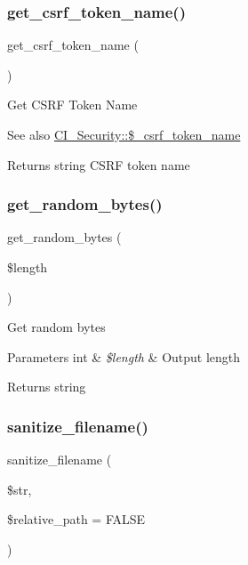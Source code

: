 \subsubsection{\texorpdfstring{get\+\_\+csrf\+\_\+token\+\_\+name()}{get\_csrf\_token\_name()}}
{\footnotesize\ttfamily get\+\_\+csrf\+\_\+token\+\_\+name (\begin{DoxyParamCaption}{ }\end{DoxyParamCaption})}

Get C\+S\+RF Token Name

\begin{DoxySeeAlso}{See also}
\mbox{\hyperlink{class_c_i___security_a6752ebca4be235c079785a87a693d932}{C\+I\+\_\+\+Security\+::\$\+\_\+csrf\+\_\+token\+\_\+name}} 
\end{DoxySeeAlso}
\begin{DoxyReturn}{Returns}
string C\+S\+RF token name 
\end{DoxyReturn}
\mbox{\label{class_c_i___security_a7d1d64e6798b98cb46fcdb304a4e1de2}} 
\subsubsection{\texorpdfstring{get\+\_\+random\+\_\+bytes()}{get\_random\_bytes()}}
{\footnotesize\ttfamily get\+\_\+random\+\_\+bytes (\begin{DoxyParamCaption}\item[{}]{\$length }\end{DoxyParamCaption})}

Get random bytes


\begin{DoxyParams}[1]{Parameters}
int & {\em \$length} & Output length \\
\hline
\end{DoxyParams}
\begin{DoxyReturn}{Returns}
string 
\end{DoxyReturn}
\mbox{\label{class_c_i___security_aaba16489285496bdc03fd12f699a08f6}} 
\subsubsection{\texorpdfstring{sanitize\+\_\+filename()}{sanitize\_filename()}}
{\footnotesize\ttfamily sanitize\+\_\+filename (\begin{DoxyParamCaption}\item[{}]{\$str,  }\item[{}]{\$relative\+\_\+path = {\ttfamily FALSE} }\end{DoxyParamCaption})}

